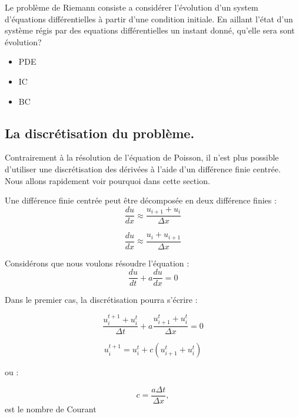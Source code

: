 Le problème de Riemann consiste a considérer l’évolution d'un system d’équations différentielles à partir d'une condition initiale.
En aillant l’état d'un système régis par des equations différentielles un instant donné, qu'elle sera sont évolution?

\begin{itemize}
\item PDE
\item IC
\item BC
\end{itemize}

\subsection{La discrétisation du problème.}

Contrairement à la résolution de l’équation de Poisson, il n'est plus possible d'utiliser une discrétisation des dérivées à l'aide d'un différence finie centrée.
Nous allons rapidement voir pourquoi dans cette section.

Une différence finie centrée peut être décomposée en deux différence finies : 
\begin{equation}
\frac{d u}{dx} \approx \frac{u_{i+1}  + u_i}{\Delta x} 
\end{equation}

\begin{equation}
\frac{d u}{dx} \approx \frac{u_i  + u_{i+1}}{\Delta x} 
\end{equation}

Considérons que nous voulons résoudre l'équation :
\begin{equation}
\frac{du}{dt} + a\frac{du}{dx} = 0
\end{equation}

Dans le premier cas, la discrétisation pourra s'écrire : 

\begin{equation}
\frac{u_i^{t+1} + u_i^t }{\Delta t}   +a \frac{u_{i+1}^t  + u_i^t}{\Delta x} = 0
\end{equation}

\begin{equation}
u_i^{t+1}  = u_i^t +  c \left( u_{i+1}^t  + u_i^t \right) 
\end{equation}

ou : 

\begin{equation}
c= \frac{a \Delta t}{\Delta x},
\end{equation}
est le nombre de Courant

